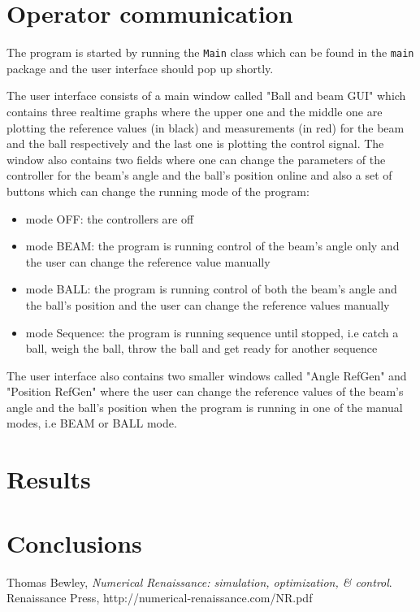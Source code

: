\documentclass{article}
\begin{document}
\section{Operator communication}\label{OpCom}
The program is started by running the \texttt{Main} class which can be found in the \texttt{main} package and the user interface should pop up shortly.

The user interface consists of a main window called "Ball and beam GUI" which contains three realtime graphs where the upper one and the middle one are plotting the reference values (in black) and measurements (in red) for the beam and the ball respectively and the last one is plotting the control signal. The window also contains two fields where one can change the parameters of the controller for the beam's angle and the ball's position online and also a set of buttons which can change the running mode of the program:
\begin{itemize}
\item mode OFF: the controllers are off
\item mode BEAM: the program is running control of the beam's angle only and the user can change the reference value manually
\item mode BALL: the program is running control of both the beam's angle and the ball's position and the user can change the reference values manually
\item mode Sequence: the program is running sequence until stopped, i.e catch a ball, weigh the ball, throw the ball and get ready for another sequence
\end{itemize}

The user interface also contains two smaller windows called "Angle RefGen" and "Position RefGen" where the user can change the reference values of the beam's angle and the ball's position when the program is running in one of the manual modes, i.e BEAM or BALL mode.
\section{Results}

\section{Conclusions}


\newpage
\begin{thebibliography}{9}
  Thomas Bewley,
  \emph{Numerical Renaissance: simulation, optimization, \& control}.
  Renaissance Press,
  http://numerical-renaissance.com/NR.pdf

\end{thebibliography}
\end{document}
